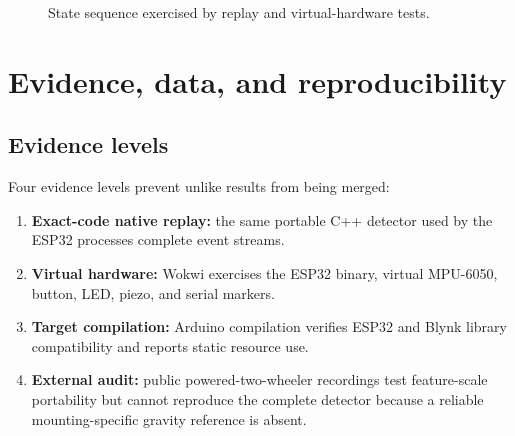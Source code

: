 \documentclass[12pt,a4paper]{article}
\begin{document}
\begin{figure}[H]
\centering
{}
\caption{State sequence exercised by replay and virtual-hardware tests.}
\end{figure}

\section{Evidence, data, and reproducibility}

\subsection{Evidence levels}

Four evidence levels prevent unlike results from being merged:

\begin{enumerate}
  \item \textbf{Exact-code native replay:} the same portable C++ detector used
        by the ESP32 processes complete event streams.
  \item \textbf{Virtual hardware:} Wokwi exercises the ESP32 binary, virtual
        MPU-6050, button, LED, piezo, and serial markers.
  \item \textbf{Target compilation:} Arduino compilation verifies ESP32 and
        Blynk library compatibility and reports static resource use.
  \item \textbf{External audit:} public powered-two-wheeler recordings test
        feature-scale portability but cannot reproduce the complete detector
        because a reliable mounting-specific gravity reference is absent.
\end{enumerate}
\end{document}
